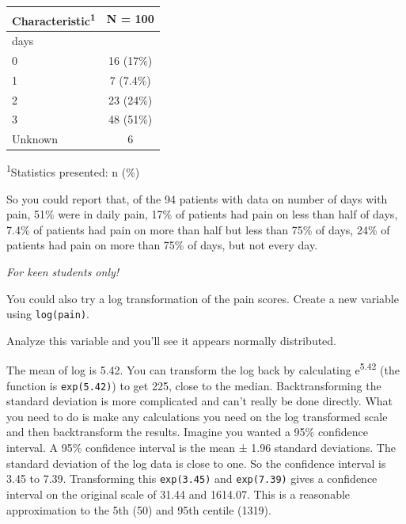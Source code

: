 \documentclass[]{book}
\newenvironment{Shaded}{\begin{snugshade}}{\end{snugshade}}
\newcommand{\DataTypeTok}[1]{\textcolor[rgb]{0.13,0.29,0.53}{#1}}
\newcommand{\KeywordTok}[1]{\textcolor[rgb]{0.13,0.29,0.53}{\textbf{#1}}}
\newcommand{\NormalTok}[1]{#1}
\newcommand{\OperatorTok}[1]{\textcolor[rgb]{0.81,0.36,0.00}{\textbf{#1}}}
\newcommand{\StringTok}[1]{\textcolor[rgb]{0.31,0.60,0.02}{#1}}
\begin{document}
\captionsetup[table]{labelformat=empty,skip=1pt}
\begin{longtable}{lc}
\toprule
\textbf{Characteristic}\textsuperscript{1} & \textbf{N = 100} \\ 
\midrule
days &  \\ 
0 & 16 (17\%) \\ 
1 & 7 (7.4\%) \\ 
2 & 23 (24\%) \\ 
3 & 48 (51\%) \\ 
Unknown & 6 \\ 
\bottomrule
\end{longtable}
\vspace{-5mm}
\begin{minipage}{\linewidth}
\textsuperscript{1}Statistics presented: n (\%) \\ 
\end{minipage}

So you could report that, of the 94 patients with data on number of days with pain, 51\% were in daily pain, 17\% of patients had pain on less than half of days, 7.4\% of patients had pain on more than half but less than 75\% of days, 24\% of patients had pain on more than 75\% of days, but not every day.

\emph{For keen students only!}

You could also try a log transformation of the pain scores. Create a new variable using \texttt{log(pain)}.

\begin{Shaded}
\end{Shaded}

Analyze this variable and you'll see it appears normally distributed.

The mean of log is 5.42. You can transform the log back by calculating e\textsuperscript{5.42} (the function is \texttt{exp(5.42)}) to get 225, close to the median. Backtransforming the standard deviation is more complicated and can't really be done directly. What you need to do is make any calculations you need on the log transformed scale and then backtransform the results. Imagine you wanted a 95\% confidence interval. A 95\% confidence interval is the mean ± 1.96 standard deviations. The standard deviation of the log data is close to one. So the confidence interval is 3.45 to 7.39. Transforming this \texttt{exp(3.45)} and \texttt{exp(7.39)} gives a confidence interval on the original scale of 31.44 and 1614.07. This is a reasonable approximation to the 5th (50) and 95th centile (1319).
\end{document}
